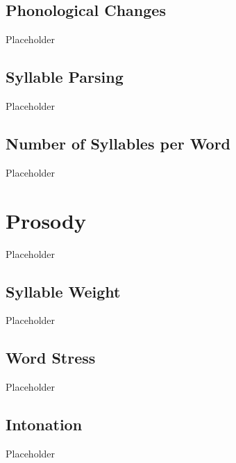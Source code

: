 \subsection{Phonological Changes}
\label{subsec:tvk-phone-changes}

Placeholder

\subsection{Syllable Parsing}
\label{subsec:tvk-syll-parse}

Placeholder

\subsection{Number of Syllables per Word}
\label{subsec:tvk-num-syll}

Placeholder

\section{Prosody}
\label{sec:tvk-prosody}

Placeholder

\subsection{Syllable Weight}
\label{subsec:tvk-syll-weight}

Placeholder

\subsection{Word Stress}
\label{subsec:tvk-word-stress}

Placeholder

\subsection{Intonation}
\label{subsec:tvk-intonation}

Placeholder